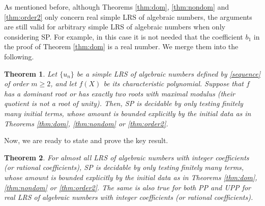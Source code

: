 \documentclass[12pt]{amsart}
\newtheorem{theorem}{Theorem}[section]
\theoremstyle{definition}
\theoremstyle{remark}
\numberwithin{equation}{section}
\begin{document}
As mentioned before, although Theorems \ref{thm:dom}, \ref{thm:nondom} and \ref{thm:order2} only concern real simple LRS of algebraic numbers, the arguments are still valid for arbitrary simple LRS of algebraic numbers when only considering SP. For example, in this case it is not needed  that the coefficient $b_1$ in the proof of Theorem \ref{thm:dom} is a real number. We merge them into the following. 

\begin{theorem}
\label{thm:Skolem}
Let $\{u_n\}$ be a simple LRS of algebraic numbers defined by \eqref{sequence} of order $m\ge 2$, and let $f(X)$ be its characteristic polynomial. Suppose that $f$ has a dominant root or has exactly two roots with maximal modulus (their quotient is not a root of unity). Then, SP is  decidable by only testing finitely many initial terms, whose amount is bounded explicitly by the initial data as in Theorems \ref{thm:dom}, \ref{thm:nondom} or \ref{thm:order2}. 
\end{theorem}

Now, we are ready to state and prove the key result. 

\begin{theorem}
\label{thm:almost}
For almost all LRS of algebraic numbers with integer coefficients (or rational coefficients), SP is  decidable by only testing finitely many terms, whose amount is bounded explicitly by the initial data as in Theorems \ref{thm:dom}, \ref{thm:nondom} or \ref{thm:order2}. The same is also true for both PP and UPP for real LRS of algebraic numbers with integer coefficients (or rational coefficients).
\end{theorem}
\end{document}
